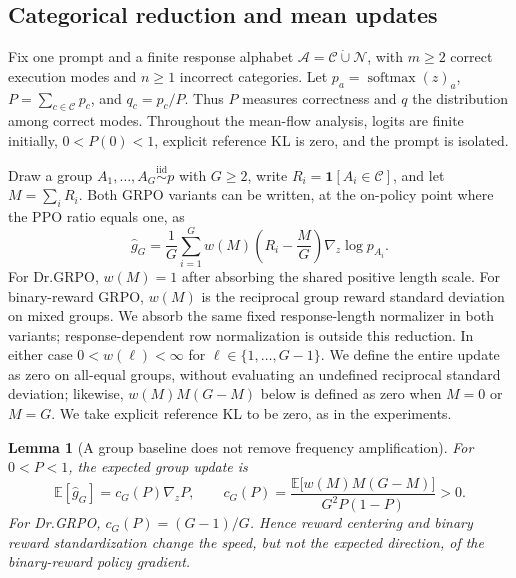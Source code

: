 \documentclass{article}
\newcommand{\1}{\mathbf 1}
\newcommand{\E}{\mathbb E}
\newtheorem{lemma}{Lemma}[section]
\theoremstyle{remark}
\theoremstyle{definition}
\theoremstyle{plain}
\begin{document}
\subsection{Categorical reduction and mean updates}
\label{app:theory-grpo-mean}

Fix one prompt and a finite response alphabet
$\mathcal A=\mathcal C\mathbin{\dot\cup}\mathcal N$, with $m\ge2$ correct
execution modes and $n\ge1$ incorrect categories. Let
$p_a=\operatorname{softmax}(z)_a$, $P=\sum_{c\in\mathcal C}p_c$, and
$q_c=p_c/P$. Thus $P$ measures correctness and $q$ the distribution among
correct modes. Throughout the mean-flow analysis, logits are finite initially,
$0<P(0)<1$, explicit reference KL is zero, and the prompt is isolated.

Draw a group $A_1,\ldots,A_G\stackrel{\mathrm{iid}}{\sim}p$ with $G\ge2$,
write $R_i=\1[A_i\in\mathcal C]$, and let $M=\sum_iR_i$. Both GRPO variants
can be written, at the on-policy point where the PPO ratio equals one, as
\begin{equation}
  \widehat g_G
  =\frac1G\sum_{i=1}^G
   w(M)\left(R_i-\frac{M}{G}\right)\nabla_z\log p_{A_i}.
  \label{eq:group-estimator}
\end{equation}
For Dr.GRPO, $w(M)=1$ after absorbing the shared positive length scale. For
binary-reward GRPO, $w(M)$ is the reciprocal group reward standard deviation
on mixed groups. We absorb the same fixed response-length normalizer in both
variants; response-dependent row normalization is outside this reduction.
In either case $0<w(\ell)<\infty$ for $\ell\in\{1,\ldots,G-1\}$.
We define the entire update as zero on all-equal groups, without evaluating an
undefined reciprocal standard deviation; likewise, $w(M)M(G-M)$ below is
defined as zero when $M=0$ or $M=G$. We take explicit reference KL to be zero, as
in the experiments.

\begin{lemma}[A group baseline does not remove frequency amplification]
\label{lem:grpo-mean}
For $0<P<1$, the expected group update is
\begin{equation}
  \E[\widehat g_G]
  =c_G(P)\nabla_z P,
  \qquad
  c_G(P)=
  \frac{\E\!\big[w(M)M(G-M)\big]}{G^2P(1-P)}>0.
  \label{eq:expected-group-gradient}
\end{equation}
For Dr.GRPO, $c_G(P)=(G-1)/G$. Hence reward centering and binary reward
standardization change the speed, but not the expected direction, of the
binary-reward policy gradient.
\end{lemma}
\end{document}
